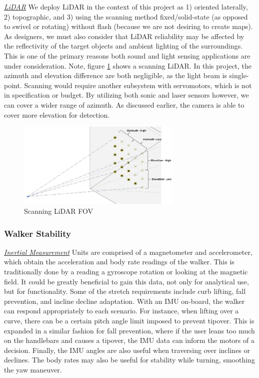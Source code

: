 \noindent \underline{\textit{LiDAR}} We deploy LiDAR in the context of this project as 1) oriented laterally, 2) topographic, and 3) using the scanning method fixed/solid-state (as opposed to swivel or rotating) without flash \cite{lidar-type} (because we are not desiring to create maps). As designers, we must also consider that LiDAR reliability may be affected by the reflectivity of the target objects and ambient lighting of the surroundings. This is one of the primary reasons both sound and light sensing applications are under consideration. Note, figure \ref{fig:lidarazimuth} shows a scanning LiDAR. In this project, the azimuth and elevation difference are both negligible, as the light beam is single-point. Scanning would require another subsystem with servomotors, which is not in specification or budget. By utilizing both sonic and laser sensors however, we can cover a wider range of azimuth. As discussed earlier, the camera is able to cover more elevation for detection.\\

\begin{figure}[H]
	\centering
	\includegraphics[width=0.7\textwidth]{./Images/FOV-scanning-LIDAR.png}
	\caption{\label{fig:lidarazimuth}Scanning LiDAR FOV \cite{coolLiDARfov}}
\end{figure}

\subsubsection{Walker Stability} \label{sssec:3_2stability}
\noindent \underline{\textit{Inertial Measurement}} Units are comprised of a magnetometer and accelerometer, which obtain the acceleration and body rate readings of the walker. This is traditionally done by a reading a gyroscope rotation or looking at the magnetic field. It could be greatly beneficial to gain this data, not only for analytical use, but for functionality. Some of the stretch requirements include curb lifting, fall prevention, and incline decline adaptation. With an IMU on-board, the walker can respond appropriately to each scenario. For instance, when lifting over a curve, there can be a certain pitch angle limit imposed to prevent tipover. This is expanded in a similar fashion for fall prevention, where if the user leans too much on the handlebars and causes a tipover, the IMU data can inform the motors of a decision. Finally, the IMU angles are also useful when traversing over inclines or declines. The body rates may also be useful for stability while turning, smoothing the yaw maneuver.\\

